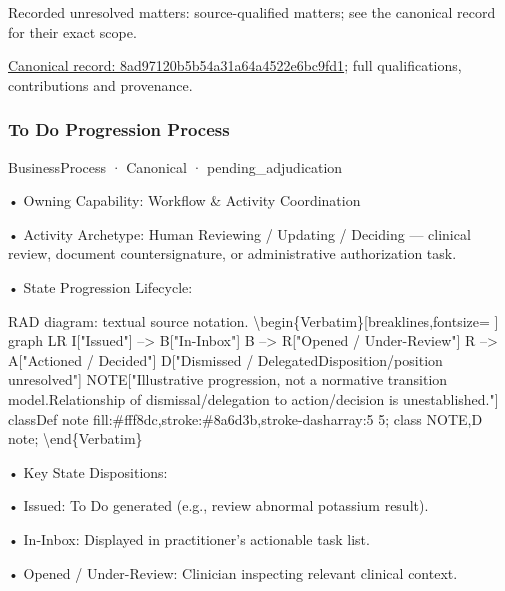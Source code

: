 {\small Recorded unresolved matters: source-qualified matters; see the canonical record for their exact scope.}\par
{\footnotesize \href{../../../../continuum/business/business-process/8ad97120b5b54a31a64a4522e6bc9fd1.md}{Canonical record: 8ad97120b5b54a31a64a4522e6bc9fd1}; full qualifications, contributions and provenance.}\par
\subsubsection{To Do Progression Process}

\label{element:c5e4c3076b094c98a628179b91ae03d0}
{\small BusinessProcess · Canonical · pending\_adjudication}\par

•
Owning Capability: Workflow \& Activity Coordination



•
Activity Archetype: Human Reviewing / Updating / Deciding — clinical review, document countersignature, or administrative authorization task.



•
State Progression Lifecycle:



RAD diagram: textual source notation.
\textbackslash{}begin\{Verbatim\}[breaklines,fontsize=
]
graph LR
    I["Issued"] --> B["In-Inbox"]
    B --> R["Opened / Under-Review"]
    R --> A["Actioned / Decided"]
    D["Dismissed / Delegated\newline{}Disposition/position unresolved"]
    NOTE["Illustrative progression, not a normative transition model.\newline{}Relationship of dismissal/delegation to action/decision is unestablished."]
    classDef note fill:\#fff8dc,stroke:\#8a6d3b,stroke-dasharray:5 5;
    class NOTE,D note;
\textbackslash{}end\{Verbatim\}



•
Key State Dispositions:



•
Issued: To Do generated (e.g., review abnormal potassium result).



•
In-Inbox: Displayed in practitioner's actionable task list.



•
Opened / Under-Review: Clinician inspecting relevant clinical context.



